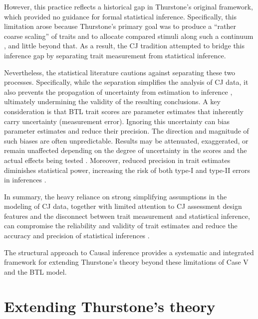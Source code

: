 \documentclass[
  authoryear,
  review,
  1p]{elsarticle}
\begin{document}
However, this practice reflects a historical gap in Thurstone's original
framework, which provided no guidance for formal statistical inference.
Specifically, this limitation arose because Thurstone's primary goal was
to produce a ``rather coarse scaling'' of traits and to allocate
compared stimuli along such a continuum \citep[p.~269]{Thurstone_1927b},
and little beyond that. As a result, the CJ tradition attempted to
bridge this inference gap by separating trait measurement from
statistical inference.

Nevertheless, the statistical literature cautions against separating
these two processes. Specifically, while the separation simplifies the
analysis of CJ data, it also prevents the propagation of uncertainty
from estimation to inference \citep{Pritikin_2020}, ultimately
undermining the validity of the resulting conclusions. A key
consideration is that BTL trait scores are parameter estimates that
inherently carry uncertainty (measurement error). Ignoring this
uncertainty can bias parameter estimates and reduce their precision. The
direction and magnitude of such biases are often unpredictable. Results
may be attenuated, exaggerated, or remain unaffected depending on the
degree of uncertainty in the scores and the actual effects being tested
\citep{McElreath_2020, Kline_et_al_2023, Hoyle_et_al_2023}. Moreover,
reduced precision in trait estimates diminishes statistical power,
increasing the risk of both type-I and type-II errors in inferences
\citep{McElreath_2020}.

In summary, the heavy reliance on strong simplifying assumptions in the
modeling of CJ data, together with limited attention to CJ assessment
design features and the disconnect between trait measurement and
statistical inference, can compromise the reliability and validity of
trait estimates
\citep{Zimmerman_1994, Perron_et_al_2015, McElreath_2020} and reduce the
accuracy and precision of statistical inferences
\citep{McElreath_2020, Kline_et_al_2023, Hoyle_et_al_2023}.

The structural approach to Causal inference provides a systematic and
integrated framework for extending Thurstone's theory beyond these
limitations of Case V and the BTL model.

\section{Extending Thurstone's theory}\label{sec-theoretical}
\end{document}
